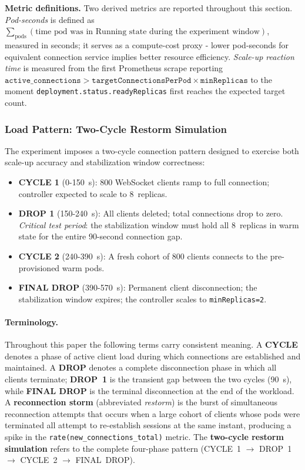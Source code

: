 \documentclass[twocolumn]{svjour3}
\begin{document}
\textbf{Metric definitions.}  Two derived metrics are reported throughout this section.  \textit{Pod-seconds} is defined as $\sum_{\text{pods}} (\text{time pod was in Running state during the experiment window})$, measured in seconds; it serves as a compute-cost proxy - lower pod-seconds for equivalent connection service implies better resource efficiency.  \textit{Scale-up reaction time} is measured from the first Prometheus scrape reporting $\texttt{active\_connections} > \texttt{targetConnectionsPerPod} \times \texttt{minReplicas}$ to the moment \texttt{deployment.status.readyReplicas} first reaches the expected target count.

\subsubsection{Load Pattern: Two-Cycle Restorm Simulation}

The experiment imposes a two-cycle connection pattern designed to exercise both scale-up accuracy and stabilization window correctness:

\begin{itemize}[leftmargin=*]
\item \textbf{CYCLE 1} (0-150~s): 800 WebSocket clients ramp to full connection; controller expected to scale to 8~replicas.
\item \textbf{DROP 1} (150-240~s): All clients deleted; total connections drop to zero. \textit{Critical test period}: the stabilization window must hold all 8~replicas in warm state for the entire 90-second connection gap.
\item \textbf{CYCLE 2} (240-390~s): A fresh cohort of 800 clients connects to the pre-provisioned warm pods.
\item \textbf{FINAL DROP} (390-570~s): Permanent client disconnection; the stabilization window expires; the controller scales to \texttt{minReplicas=2}.
\end{itemize}

\paragraph{Terminology.}  Throughout this paper the following terms carry consistent meaning.  A \textbf{CYCLE} denotes a phase of active client load during which connections are established and maintained.  A \textbf{DROP} denotes a complete disconnection phase in which all clients terminate; \textbf{DROP~1} is the transient gap between the two cycles (90~s), while \textbf{FINAL DROP} is the terminal disconnection at the end of the workload.  A \textbf{reconnection storm} (abbreviated \textit{restorm}) is the burst of simultaneous reconnection attempts that occurs when a large cohort of clients whose pods were terminated all attempt to re-establish sessions at the same instant, producing a spike in the \texttt{rate(new\_connections\_total)} metric.  The \textbf{two-cycle restorm simulation} refers to the complete four-phase pattern (CYCLE~1 $\rightarrow$ DROP~1 $\rightarrow$ CYCLE~2 $\rightarrow$ FINAL~DROP).
\end{document}
